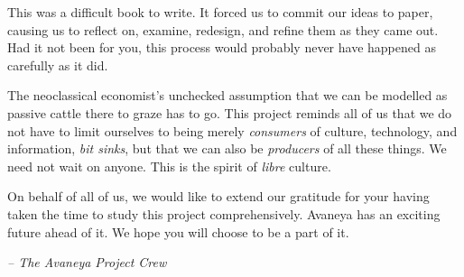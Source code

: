 

This was a difficult book to write. It forced us to commit our ideas to paper, causing us to reflect on, examine, redesign, and refine them as they came out. Had it not been for you, this process would probably never have happened as carefully as it did.

The neoclassical economist's unchecked assumption that we can be modelled as passive cattle there to graze has to go. This project reminds all of us that we do not have to limit ourselves to being merely {\it consumers} of culture, technology, and information, {\it bit sinks}, but that we can also be {\it producers} of all these things. We need not wait on anyone. This is the spirit of {\it libre} culture.

On behalf of all of us, we would like to extend our gratitude for your having taken the time to study this project comprehensively. Avaneya has an exciting future ahead of it. We hope you will choose to be a part of it. 

\hskip 1.5cm {\it -- The Avaneya Project Crew}

\StopChapter

